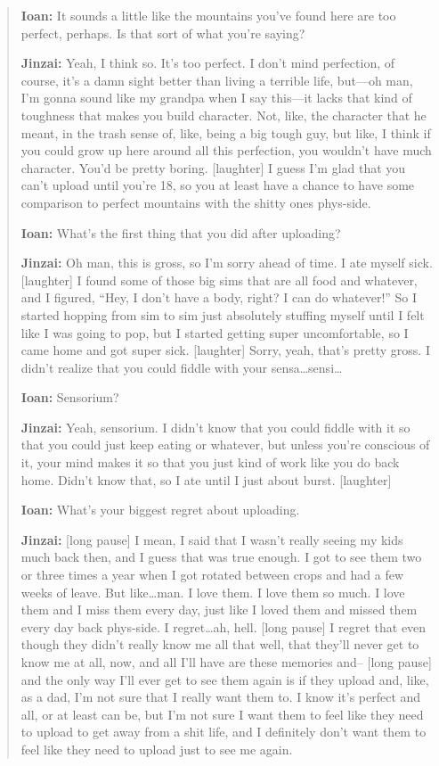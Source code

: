 \begin{quote}
\textbf{Ioan:} It sounds a little like the mountains you've found here are too perfect, perhaps. Is that sort of what you're saying?

\textbf{Jinzai:} Yeah, I think so. It's too perfect. I don't mind perfection, of course, it's a damn sight better than living a terrible life, but---oh man, I'm gonna sound like my grandpa when I say this---it lacks that kind of toughness that makes you build character. Not, like, the character that he meant, in the trash sense of, like, being a big tough guy, but like, I think if you could grow up here around all this perfection, you wouldn't have much character. You'd be pretty boring. {[}laughter{]} I guess I'm glad that you can't upload until you're 18, so you at least have a chance to have some comparison to perfect mountains with the shitty ones phys-side.

\textbf{Ioan:} What's the first thing that you did after uploading?

\textbf{Jinzai:} Oh man, this is gross, so I'm sorry ahead of time. I ate myself sick. {[}laughter{]} I found some of those big sims that are all food and whatever, and I figured, ``Hey, I don't have a body, right? I can do whatever!'' So I started hopping from sim to sim just absolutely stuffing myself until I felt like I was going to pop, but I started getting super uncomfortable, so I came home and got super sick. {[}laughter{]} Sorry, yeah, that's pretty gross. I didn't realize that you could fiddle with your sensa\ldots sensi\ldots{}

\textbf{Ioan:} Sensorium?

\textbf{Jinzai:} Yeah, sensorium. I didn't know that you could fiddle with it so that you could just keep eating or whatever, but unless you're conscious of it, your mind makes it so that you just kind of work like you do back home. Didn't know that, so I ate until I just about burst. {[}laughter{]}

\textbf{Ioan:} What's your biggest regret about uploading.

\textbf{Jinzai:} {[}long pause{]} I mean, I said that I wasn't really seeing my kids much back then, and I guess that was true enough. I got to see them two or three times a year when I got rotated between crops and had a few weeks of leave. But like\ldots man. I love them. I love them so much. I love them and I miss them every day, just like I loved them and missed them every day back phys-side. I regret\ldots ah, hell. {[}long pause{]} I regret that even though they didn't really know me all that well, that they'll never get to know me at all, now, and all I'll have are these memories and-- {[}long pause{]} and the only way I'll ever get to see them again is if they upload and, like, as a dad, I'm not sure that I really want them to. I know it's perfect and all, or at least can be, but I'm not sure I want them to feel like they need to upload to get away from a shit life, and I definitely don't want them to feel like they need to upload just to see me again.
\end{quote}

